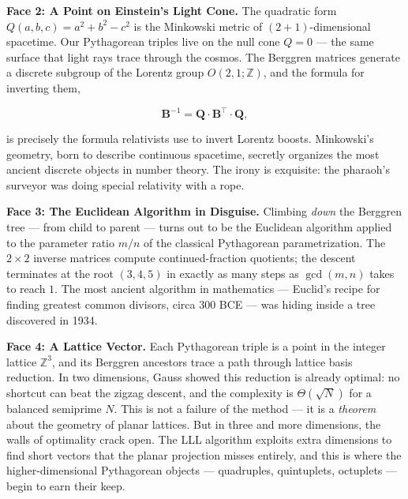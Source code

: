 \documentclass[11pt,openright,twoside]{book}
\theoremstyle{definition}
\begin{document}
\textbf{Face 2: A Point on Einstein's Light Cone.} The quadratic form $Q(a, b, c) = a^2 + b^2 - c^2$ is the Minkowski metric of $(2{+}1)$-dimensional spacetime. Our Pythagorean triples live on the null cone $Q = 0$ --- the same surface that light rays trace through the cosmos. The Berggren matrices generate a discrete subgroup of the Lorentz group $O(2,1;\mathbb{Z})$, and the formula for inverting them,

\[
\mathbf{B}^{-1} = \mathbf{Q} \cdot \mathbf{B}^{\!\top} \cdot \mathbf{Q},
\]

is precisely the formula relativists use to invert Lorentz boosts. Minkowski's geometry, born to describe continuous spacetime, secretly organizes the most ancient discrete objects in number theory. The irony is exquisite: the pharaoh's surveyor was doing special relativity with a rope.

\textbf{Face 3: The Euclidean Algorithm in Disguise.} Climbing \textit{down} the Berggren tree --- from child to parent --- turns out to be the Euclidean algorithm applied to the parameter ratio $m/n$ of the classical Pythagorean parametrization. The $2 \times 2$ inverse matrices compute continued-fraction quotients; the descent terminates at the root $(3, 4, 5)$ in exactly as many steps as $\gcd(m, n)$ takes to reach $1$. The most ancient algorithm in mathematics --- Euclid's recipe for finding greatest common divisors, circa 300 BCE --- was hiding inside a tree discovered in 1934.

\textbf{Face 4: A Lattice Vector.} Each Pythagorean triple is a point in the integer lattice $\mathbb{Z}^3$, and its Berggren ancestors trace a path through lattice basis reduction. In two dimensions, Gauss showed this reduction is already optimal: no shortcut can beat the zigzag descent, and the complexity is $\Theta(\sqrt{N})$ for a balanced semiprime $N$. This is not a failure of the method --- it is a \textit{theorem} about the geometry of planar lattices. But in three and more dimensions, the walls of optimality crack open. The LLL algorithm exploits extra dimensions to find short vectors that the planar projection misses entirely, and this is where the higher-dimensional Pythagorean objects --- quadruples, quintuplets, octuplets --- begin to earn their keep.
\end{document}
